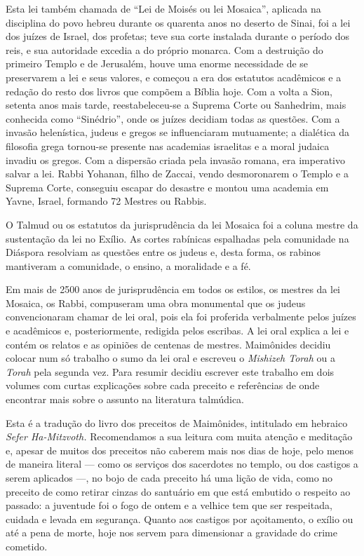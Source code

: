 Esta lei também chamada de ``Lei de Moisés ou lei Mosaica'', aplicada na
disciplina do povo hebreu durante os quarenta anos no deserto de Sinai,
foi a lei dos juízes de Israel, dos profetas; teve sua corte instalada
durante o período dos reis,
e sua autoridade excedia a do próprio monarca. Com a destruição do
primeiro Templo e de Jerusalém, houve uma enorme necessidade de se
preservarem a lei e seus valores, e começou a era dos estatutos
acadêmicos e a redação do resto dos livros que compõem a Bíblia hoje.
Com a volta a Sion, setenta anos mais tarde, reestabeleceu-se a Suprema
Corte ou Sanhedrim, mais conhecida como ``Sinédrio'', onde os juízes
decidiam todas as questões. Com a invasão helenística, judeus e gregos
se influenciaram mutuamente; a dialética da filosofia grega tornou-se
presente nas academias israelitas e a moral judaica invadiu os gregos.
Com a dispersão criada pela invasão romana, era imperativo salvar a lei.
Rabbi Yohanan, filho de Zaccai, vendo desmoronarem o Templo e a Suprema
Corte, conseguiu escapar do desastre e montou uma academia em Yavne,
Israel, formando 72 Mestres ou Rabbis.

O Talmud ou os estatutos da jurisprudência da lei Mosaica foi a coluna
mestre da sustentação da lei no Exílio. As cortes rabínicas espalhadas
pela comunidade na Diáspora resolviam as questões entre os judeus e,
desta forma, os rabinos mantiveram a comunidade, o ensino, a moralidade
e a fé.

Em mais de 2500 anos de jurisprudência em todos os estilos, os mestres
da lei Mosaica, os Rabbi, compuseram uma obra monumental que os judeus
convencionaram chamar de lei oral, pois ela foi proferida verbalmente
pelos juízes e acadêmicos e, posteriormente, redigida pelos escribas. A
lei oral explica a lei e contém os relatos e as opiniões de centenas de
mestres. Maimônides decidiu colocar num só trabalho o sumo da lei oral e
escreveu o \emph{Mishizeh Torah} ou a \emph{Torah} pela segunda vez.
Para resumir decidiu escrever este trabalho em dois volumes com curtas
explicações sobre cada preceito e referências de onde encontrar mais
sobre o assunto na literatura talmúdica.

Esta é a tradução do livro dos preceitos de Maimônides, intitulado em
hebraico \emph{Sefer Ha-Mitzvoth.} Recomendamos a sua leitura com muita
atenção e meditação e, apesar de muitos dos preceitos não caberem mais
nos dias de hoje, pelo menos de maneira literal --- como os serviços dos
sacerdotes no templo, ou dos castigos a serem aplicados ---, no bojo de
cada preceito há uma lição de vida, como no preceito de como retirar
cinzas do santuário em que está embutido o respeito ao passado: a
juventude foi o fogo de ontem e a velhice tem que ser respeitada,
cuidada e levada em segurança. Quanto aos castigos por açoitamento, o
exílio ou até a pena de morte, hoje nos servem para dimensionar a
gravidade do crime cometido.

